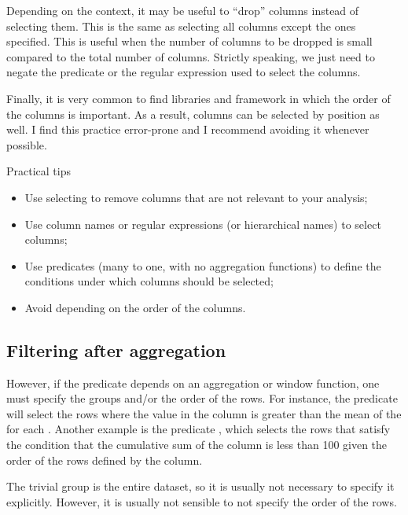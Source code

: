 Depending on the context, it may be useful to ``drop'' columns instead of selecting them.
This is the same as selecting all columns except the ones specified.  This is useful when
the number of columns to be dropped is small compared to the total number of columns.
Strictly speaking, we just need to negate the predicate or the regular expression used to
select the columns.

Finally, it is very common to find libraries and framework in which the order of the
columns is important.  As a result, columns can be selected by position as well.
I find this practice error-prone and I recommend avoiding it whenever possible.

\begin{hlbox}{Practical tips}
  \begin{itemize}
    \item Use selecting to remove columns that are not relevant to your analysis;
    \item Use column names or regular expressions (or hierarchical names) to select columns;
    \item Use predicates (many to one, with no aggregation functions) to define the conditions
      under which columns should be selected;
    \item Avoid depending on the order of the columns.
  \end{itemize}
\end{hlbox}

\subsection{Filtering after aggregation}
\label{sub:filter-value}

However, if the predicate depends on an aggregation or window function, one must specify
the groups and/or the order of the rows.  For instance, the predicate  will select the rows where the value in the 
column is greater than the mean of the  for each . Another
example is the predicate , which selects the rows
that satisfy the condition that the cumulative sum of the  column is less
than 100 given the order of the rows defined by the  column.

The trivial group is the entire dataset, so it is usually not necessary to specify it
explicitly.  However, it is usually not sensible to not specify the order of the rows.

